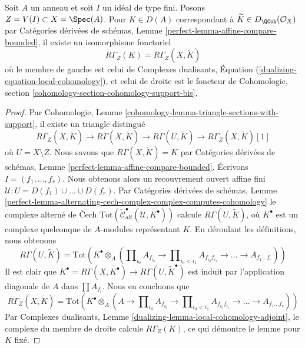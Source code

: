 \begin{lemma}
\label{lemma-local-cohomology-is-local-cohomology}
Soit $A$ un anneau et soit $I$ un idéal de type fini.
Posons $Z = V(I) \subset X = \Spec(A)$. Pour $K \in D(A)$ correspondant
à $\widetilde{K} \in D_\QCoh(\mathcal{O}_X)$ par
Catégories dérivées de schémas, Lemme \ref{perfect-lemma-affine-compare-bounded},
il existe un isomorphisme fonctoriel
$$
R\Gamma_Z(K) = R\Gamma_Z(X, \widetilde{K})
$$
où le membre de gauche est celui de
Complexes dualisants, Équation (\ref{dualizing-equation-local-cohomology}),
et celui de droite est le foncteur de
Cohomologie, section \ref{cohomology-section-cohomology-support-bis}.
\end{lemma}

\begin{proof}
Par Cohomologie, Lemme \ref{cohomology-lemma-triangle-sections-with-support},
il existe un triangle distingué
$$
R\Gamma_Z(X, \widetilde{K})
\to R\Gamma(X, \widetilde{K})
\to R\Gamma(U, \widetilde{K})
\to R\Gamma_Z(X, \widetilde{K})[1]
$$
où $U = X \setminus Z$. Nous savons que $R\Gamma(X, \widetilde{K}) = K$
par Catégories dérivées de schémas, Lemme
\ref{perfect-lemma-affine-compare-bounded}.
Écrivons $I = (f_1, \ldots, f_r)$. Nous obtenons alors un recouvrement ouvert
affine fini $\mathcal{U} : U = D(f_1) \cup \ldots \cup D(f_r)$.
Par Catégories dérivées de schémas, Lemme
\ref{perfect-lemma-alternating-cech-complex-complex-computes-cohomology}
le complexe alterné de {\v C}ech
$\text{Tot}(\check{\mathcal{C}}_{alt}^\bullet(\mathcal{U},
\widetilde{K^\bullet}))$
calcule $R\Gamma(U, \widetilde{K})$, où $K^\bullet$ est un
complexe quelconque de $A$-modules représentant $K$. En déroulant les
définitions, nous obtenons
$$
R\Gamma(U, \widetilde{K}) =
\text{Tot}\left(
K^\bullet \otimes_A
(\prod\nolimits_{i_0} A_{f_{i_0}} \to
\prod\nolimits_{i_0 < i_1} A_{f_{i_0}f_{i_1}} \to
\ldots \to A_{f_1\ldots f_r})\right)
$$
Il est clair que
$K^\bullet = R\Gamma(X, \widetilde{K^\bullet}) \to
R\Gamma(U, \widetilde{K}^\bullet)$
est induit par l'application diagonale de $A$ dans $\prod A_{f_i}$.
Nous en concluons que
$$
R\Gamma_Z(X, \widetilde{K}) =
\text{Tot}\left(
K^\bullet \otimes_A
(A \to \prod\nolimits_{i_0} A_{f_{i_0}} \to
\prod\nolimits_{i_0 < i_1} A_{f_{i_0}f_{i_1}} \to
\ldots \to A_{f_1\ldots f_r})\right)
$$
Par Complexes dualisants, Lemme \ref{dualizing-lemma-local-cohomology-adjoint},
le complexe du membre de droite calcule $R\Gamma_Z(K)$,
ce qui démontre le lemme pour $K$ fixé.


\end{proof}
